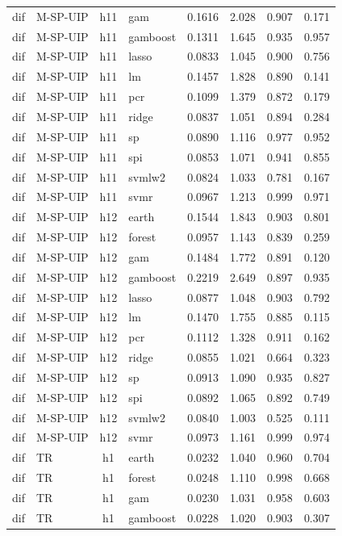 \begin{ThreePartTable}
\begin{longtable}[t]{llclcccc}
dif & M-SP-UIP & h11 & gam & 0.1616 & 2.028 & 0.907 & 0.171\\
dif & M-SP-UIP & h11 & gamboost & 0.1311 & 1.645 & 0.935 & 0.957\\
dif & M-SP-UIP & h11 & lasso & 0.0833 & 1.045 & 0.900 & 0.756\\
dif & M-SP-UIP & h11 & lm & 0.1457 & 1.828 & 0.890 & 0.141\\
dif & M-SP-UIP & h11 & pcr & 0.1099 & 1.379 & 0.872 & 0.179\\
dif & M-SP-UIP & h11 & ridge & 0.0837 & 1.051 & 0.894 & 0.284\\
dif & M-SP-UIP & h11 & sp & 0.0890 & 1.116 & 0.977 & 0.952\\
dif & M-SP-UIP & h11 & spi & 0.0853 & 1.071 & 0.941 & 0.855\\
dif & M-SP-UIP & h11 & svmlw2 & 0.0824 & 1.033 & 0.781 & 0.167\\
dif & M-SP-UIP & h11 & svmr & 0.0967 & 1.213 & 0.999 & 0.971\\
\addlinespace
dif & M-SP-UIP & h12 & earth & 0.1544 & 1.843 & 0.903 & 0.801\\
dif & M-SP-UIP & h12 & forest & 0.0957 & 1.143 & 0.839 & 0.259\\
dif & M-SP-UIP & h12 & gam & 0.1484 & 1.772 & 0.891 & 0.120\\
dif & M-SP-UIP & h12 & gamboost & 0.2219 & 2.649 & 0.897 & 0.935\\
dif & M-SP-UIP & h12 & lasso & 0.0877 & 1.048 & 0.903 & 0.792\\
dif & M-SP-UIP & h12 & lm & 0.1470 & 1.755 & 0.885 & 0.115\\
dif & M-SP-UIP & h12 & pcr & 0.1112 & 1.328 & 0.911 & 0.162\\
dif & M-SP-UIP & h12 & ridge & 0.0855 & 1.021 & 0.664 & 0.323\\
dif & M-SP-UIP & h12 & sp & 0.0913 & 1.090 & 0.935 & 0.827\\
dif & M-SP-UIP & h12 & spi & 0.0892 & 1.065 & 0.892 & 0.749\\
dif & M-SP-UIP & h12 & svmlw2 & 0.0840 & 1.003 & 0.525 & 0.111\\
dif & M-SP-UIP & h12 & svmr & 0.0973 & 1.161 & 0.999 & 0.974\\
\addlinespace
dif & TR & h1 & earth & 0.0232 & 1.040 & 0.960 & 0.704\\
dif & TR & h1 & forest & 0.0248 & 1.110 & 0.998 & 0.668\\
dif & TR & h1 & gam & 0.0230 & 1.031 & 0.958 & 0.603\\
dif & TR & h1 & gamboost & 0.0228 & 1.020 & 0.903 & 0.307\\

\end{longtable}
\end{ThreePartTable}
